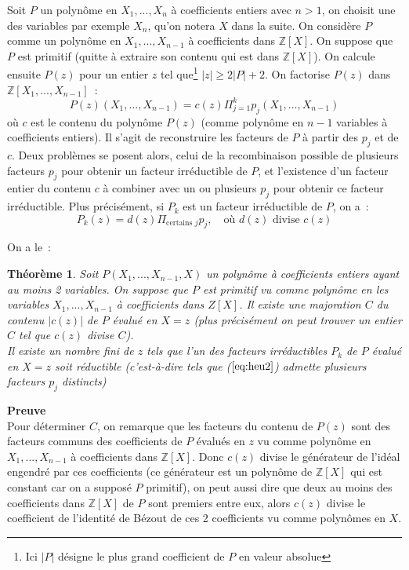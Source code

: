 \documentclass[a4paper,11pt]{book}
\newtheorem{thm}{Théorème}
\begin{document}
\begin{giacjshere}
Soit $P$ un polynôme en $X_1,...,X_n$ à coefficients entiers avec $n>1$,
on choisit une des variables par exemple $X_n$, qu'on notera $X$ dans la suite.
On considère $P$ comme un polynôme en $X_1,...,X_{n-1}$ à coefficients dans 
$\mathbb{Z}[X]$. On suppose que $P$ est primitif (quitte à extraire
son contenu qui est dans $\mathbb{Z}[X]$). On calcule ensuite
$P(z)$ pour un entier $z$ tel que\footnote{Ici $|P|$ désigne le plus grand
coefficient de $P$ en valeur absolue} $|z| \geq 2|P|+2$. On factorise $P(z)$
dans $\mathbb{Z}[X_1,...,X_{n-1}]$~:
\begin{equation} \label{eq:heu1}
 P(z)(X_1,...,X_{n-1})=c(z) \Pi_{j=1}^k p_j(X_1,...,X_{n-1})
\end{equation}
où $c$ est le contenu du polynôme $P(z)$ (comme polynôme en $n-1$ 
variables à coefficients entiers). Il s'agit de reconstruire les facteurs
de $P$ à partir des $p_j$ et de $c$. Deux problèmes se posent alors,
celui de la recombinaison possible de plusieurs facteurs $p_j$ pour
obtenir un facteur irréductible de $P$, et l'existence d'un facteur entier du
contenu $c$ à combiner avec un ou plusieurs $p_j$ pour obtenir ce
facteur irréductible. Plus précisément, si $P_k$ est un facteur 
irréductible de $P$, on a~:
\begin{equation} \label{eq:heu2}
 P_k(z)=d(z) \Pi_{\mbox{certains } j} p_j, \quad \mbox{où } 
d(z) \mbox{ divise } c(z)
\end{equation}

On a le~:
\begin{thm}
Soit $P(X_1,...,X_{n-1},X)$ un polynôme à coefficients 
entiers ayant au moins 2 variables. On suppose que $P$ est primitif
vu comme polynôme en les variables $X_1,...,X_{n-1}$
à coefficients dans $Z[X]$.
Il existe une majoration $C$ du contenu $|c(z)|$ de $P$ évalué en $X=z$
(plus précisément on peut trouver un entier $C$ tel que $c(z)$ divise
$C$).\\
Il existe un nombre fini de $z$ tels que l'un des facteurs irréductibles
$P_k$ de $P$ évalué en $X=z$ soit
réductible (c'est-à-dire tels que (\(\ref{eq:heu2}\)) admette 
plusieurs facteurs $p_j$ distincts)
\end{thm}

{\bf Preuve}\\
Pour déterminer $C$, on remarque que les facteurs du contenu de $P(z)$
sont des facteurs communs des coefficients de $P$ évalués en $z$
vu comme polynôme en $X_1,...,X_{n-1}$ à coefficients dans $\mathbb{Z}[X]$.
Donc $c(z)$ divise le générateur de l'idéal engendré par ces coefficients
(ce générateur est un polynôme de $\mathbb{Z}[X]$ qui est constant car on a supposé
$P$ primitif), on peut aussi dire que deux au moins des coefficients
dans $\mathbb{Z}[X]$ de $P$ sont premiers entre eux, alors $c(z)$ divise le
coefficient de l'identité de Bézout de ces 2 coefficients vu
comme polynômes en $X$.


\end{giacjshere}
\end{document}
